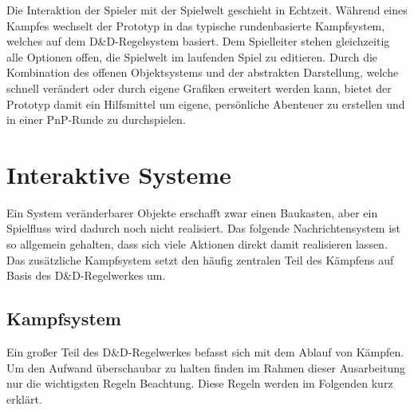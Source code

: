 Die Interaktion der Spieler mit der Spielwelt geschieht in Echtzeit. Während eines Kampfes wechselt der Prototyp in das typische rundenbasierte Kampfsystem, welches auf dem D\&D-Regelsystem basiert. Dem Spielleiter stehen gleichzeitig alle Optionen offen, die Spielwelt im laufenden Spiel zu editieren.\newline
Durch die Kombination des offenen Objektsystems und der abstrakten Darstellung, welche schnell verändert oder durch eigene Grafiken erweitert werden kann, bietet der Prototyp damit ein Hilfsmittel um eigene, persönliche Abenteuer zu erstellen und in einer PnP-Runde zu durchspielen.


\section{Interaktive Systeme}
\label{sec:InteraktiveSysteme}
Ein System veränderbarer Objekte erschafft zwar einen Baukasten, aber ein Spielfluss wird dadurch noch nicht realisiert. Das folgende Nachrichtensystem ist so allgemein gehalten, dass sich viele Aktionen direkt damit realisieren lassen. Das zusätzliche Kampfsystem setzt den häufig zentralen Teil des Kämpfens auf Basis des D\&D-Regelwerkes um.

\subsection{Kampfsystem}
\label{sec:Kampfsystem}
Ein großer Teil des D\&D-Regelwerkes befasst sich mit dem Ablauf von Kämpfen. Um den Aufwand überschaubar zu halten finden im Rahmen dieser Ausarbeitung nur die wichtigsten Regeln Beachtung. Diese Regeln werden im Folgenden kurz erklärt.~\cite{SRD35}

